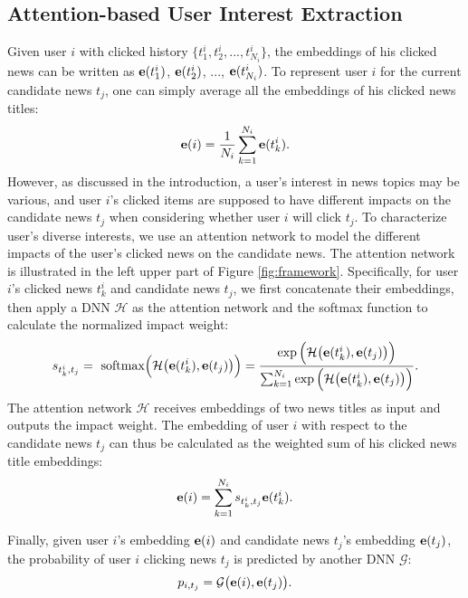 \documentclass[sigconf]{acmart}
\begin{document}
	\subsection{Attention-based User Interest Extraction}
	\label{sec:auie}
		Given user $i$ with clicked history $\{ t_1^i, t_2^i, ..., t_{N_i}^i \}$, the embeddings of his clicked news can be written as ${\bf e}(t_1^i)$, ${\bf e}(t_2^i)$, ..., ${\bf e}(t_{N_i}^i)$.
		To represent user $i$ for the current candidate news $t_j$, one can simply average all the embeddings of his clicked news titles:
		\begin{equation}
			{\bf e}(i) = \frac{1}{N_i} \sum_{k=1}^{N_i} {\bf e}(t_k^i).
		\end{equation}
		However, as discussed in the introduction, a user's interest in news topics may be various, and user $i$'s clicked items are supposed to have different impacts on the candidate news $t_j$ when considering whether user $i$ will click $t_j$.
		To characterize user's diverse interests, we use an attention network \cite{wang2017dynamic, zhou2017deep} to model the different impacts of the user's clicked news on the candidate news.
		The attention network is illustrated in the left upper part of Figure \ref{fig:framework}.
		Specifically, for user $i$'s clicked news $t_k^i$ and candidate news $t_j$, we first concatenate their embeddings, then apply a DNN $\mathcal H$ as the attention network and the softmax function to calculate the normalized impact weight: 
		\begin{equation}
			s_{t_k^i, t_j} = \ \text{softmax} \Big( \mathcal H \big( {\bf e}(t_k^i), {\bf e}(t_j) \big) \Big) = \frac{\exp \Big( \mathcal H \big( {\bf e}(t_k^i), {\bf e}(t_j) \big) \Big)}{\sum_{k=1}^{N_i} \exp \Big( \mathcal H \big( {\bf e}(t_k^i), {\bf e}(t_j) \big) \Big)}.
		\end{equation}
		The attention network $\mathcal H$ receives embeddings of two news titles as input and outputs the impact weight.
		The embedding of user $i$ with respect to the candidate news $t_j$ can thus be calculated as the weighted sum of his clicked news title embeddings:
		\begin{equation}
			{\bf e}(i) = \sum_{k=1}^{N_i} s_{t_k^i, t_j} {\bf e}(t_k^i).
		\end{equation}
		
		Finally, given user $i$'s embedding ${\bf e}(i)$ and candidate news $t_j$'s embedding ${\bf e}(t_j)$, the probability of user $i$ clicking news $t_j$ is predicted by another DNN $\mathcal G$:
		\begin{equation}
			p_{i, t_j} = \mathcal G \big( {\bf e}(i), {\bf e}(t_j) \big).
		\end{equation}
		
\end{document}
